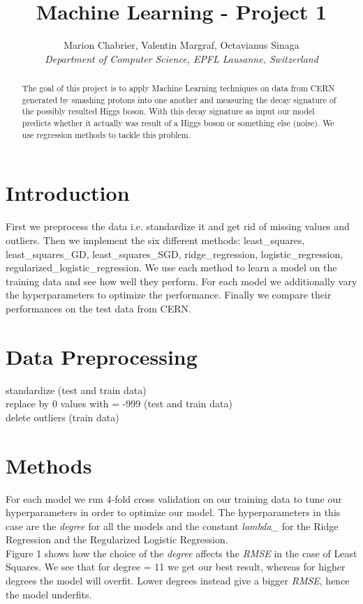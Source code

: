 \documentclass[10pt,conference,compsocconf]{IEEEtran}
\begin{document}
\title{Machine Learning - Project 1}

\author{
  Marion Chabrier, Valentin Margraf, Octavianus Sinaga\\
  \textit{Department of Computer Science, EPFL Lausanne, Switzerland}
}

\maketitle

\begin{abstract}
The goal of this project is to apply Machine Learning techniques on data from CERN generated by smashing protons into one another and measuring the decay signature of the possibly resulted Higgs boson. With this decay signature as input our model predicts whether it actually was result of a Higgs boson or something else (noise). We use regression methods to tackle this problem.
\end{abstract}

\section{Introduction}
First we preprocess the data i.e. standardize it and get rid of missing values and outliers.
Then we implement the six different methods: least\_squares, least\_squares\_GD, least\_squares\_SGD, ridge\_regression, logistic\_regression, regularized\_logistic\_regression. We use each method to learn a model on the training data and see how well they perform. For each model we additionally vary the hyperparameters to optimize the performance. Finally we compare their performances on the test data from CERN.



\section{Data Preprocessing}
\label{sec:prepro}

standardize (test and train data)\\
replace by 0  values with = -999 (test and train data)\\
delete outliers (train data)



\section{Methods}
\label{sec:tips-writing}


For each model we run 4-fold cross validation on our training data to tune our hyperparameters in order to optimize our model. The hyperparameters in this case are the \textit{degree} for all the models and the constant \textit{lambda\_} for the Ridge Regression and the Regularized Logistic Regression.
\\
Figure 1 shows how the choice of the \textit{degree} affects the \textit{RMSE} in the case of Least Squares. We see that for degree = 11 we get our best result, whereas for higher degrees the model will overfit. Lower degrees instead give a bigger \textit{RMSE}, hence the model underfits.
\end{document}

